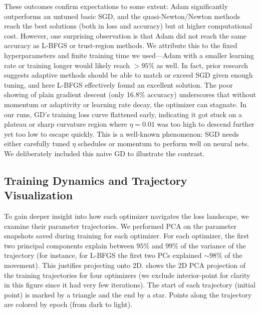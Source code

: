 \documentclass[12pt]{article}
\begin{document}
These outcomes confirm expectations to some extent: Adam significantly outperforms an untuned basic SGD, and the quasi-Newton/Newton methods reach the best solutions (both in loss and accuracy) but at higher computational cost. However, one surprising observation is that Adam did not reach the same accuracy as L-BFGS or trust-region methods. We attribute this to the fixed hyperparameters and finite training time we used—Adam with a smaller learning rate or training longer would likely reach $>95\%$ as well. In fact, prior research suggests adaptive methods should be able to match or exceed SGD given enough tuning, and here L-BFGS effectively found an excellent solution. The poor showing of plain gradient descent (only 16.8\% accuracy) underscores that without momentum or adaptivity or learning rate decay, the optimizer can stagnate. In our runs, GD’s training loss curve flattened early, indicating it got stuck on a plateau or sharp curvature region where $\eta=0.01$ was too high to descend further yet too low to escape quickly. This is a well-known phenomenon: SGD needs either carefully tuned $\eta$ schedules or momentum to perform well on neural nets. We deliberately included this naive GD to illustrate the contrast.

\subsection{Training Dynamics and Trajectory Visualization}
To gain deeper insight into how each optimizer navigates the loss landscape, we examine their parameter trajectories. We performed PCA on the parameter snapshots saved during training for each optimizer. For each optimizer, the first two principal components explain between $95\%$ and $99\%$ of the variance of the trajectory (for instance, for L-BFGS the first two PCs explained $\sim98\%$ of the movement). This justifies projecting onto 2D.  shows the 2D PCA projection of the training trajectories for four optimizers (we exclude interior-point for clarity in this figure since it had very few iterations). The start of each trajectory (initial point) is marked by a triangle and the end by a star. Points along the trajectory are colored by epoch (from dark to light).
\end{document}
